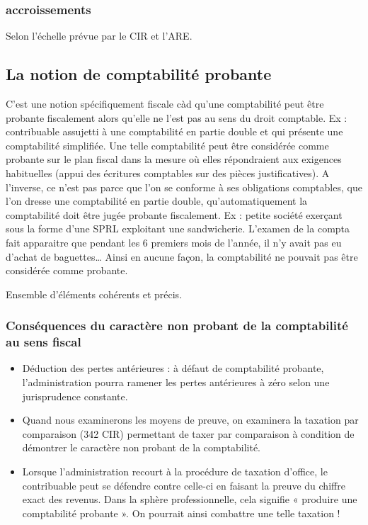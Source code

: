 \documentclass{book}
\begin{document}
\subsubsection{accroissements}
 
Selon l’échelle prévue par le CIR et l’ARE. 

\subsection{La notion de comptabilité probante}	 
C’est une notion spécifiquement fiscale càd qu’une comptabilité peut être probante fiscalement alors qu’elle ne l’est pas au sens du droit comptable. 
Ex : contribuable assujetti à une comptabilité en partie double et qui présente une comptabilité simplifiée. Une telle comptabilité peut être considérée comme probante sur le plan fiscal dans la mesure où elles répondraient aux exigences habituelles (appui des écritures comptables sur des pièces justificatives). 
A l’inverse, ce n’est pas parce que l’on se conforme à ses obligations comptables, que l’on dresse une comptabilité en partie double, qu’automatiquement la comptabilité doit être jugée probante fiscalement. 
Ex : petite société exerçant sous la forme d’une SPRL exploitant une sandwicherie. L’examen de la compta fait apparaitre que pendant les 6 premiers mois de l’année, il n’y avait pas eu d’achat de baguettes… Ainsi en aucune façon, la comptabilité ne pouvait pas être considérée comme probante.

Ensemble d'éléments cohérents et précis.

\subsubsection{Conséquences du caractère non probant de la comptabilité au sens fiscal}

\begin{itemize}
\item Déduction des pertes antérieures : à défaut de comptabilité probante, l’administration pourra ramener les pertes antérieures à zéro selon une jurisprudence constante. 
\item Quand nous examinerons les moyens de preuve, on examinera la taxation par comparaison (342 CIR) permettant de taxer par comparaison à condition de démontrer le caractère non probant de la comptabilité. 
\item Lorsque l’administration recourt à la procédure de taxation d’office, le contribuable peut se défendre contre celle-ci en faisant la preuve du chiffre exact des revenus. Dans la sphère professionnelle, cela signifie « produire une comptabilité probante ». On pourrait ainsi combattre une telle taxation !
\end{itemize}
\end{document}

